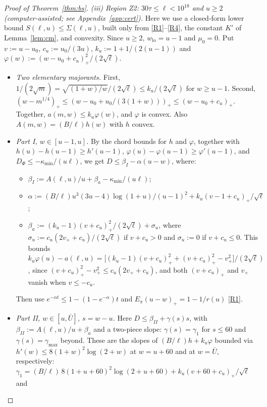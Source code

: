\begin{proof}[Proof of Theorem~\ref{thm:bs}]
\smallskip\noindent\emph{(iii) Region Z2: $30\tau\le\ell<10^{18}$ and $u\ge2$ (computer-assisted; see Appendix~\ref{app:cert}).}
Here we use a closed-form lower bound $S(\ell,u)\le\Sigma(\ell,u)$, built only from \ref{R1}--\ref{R4}, the constant $K'$ of
Lemma~\ref{lem:cm}, and convexity. Since $u\ge2$, $w_{\mathrm{lo}}=u-1$ and $\mu_0=0$. Put $v:=u-u_0$,
$c_u:=u_0/(3u)$, $k_u:=1+1/(2(u-1))$ and $\varphi(w):=(w-u_0+c_u)_+^2/(2\sqrt\ell)$.
\begin{itemize}
\item \emph{Two elementary majorants.} First, $1/(2\sqrt m)=\sqrt{(1+w)/w}/(2\sqrt\ell)\le k_u/(2\sqrt\ell)$ for $w\ge u-1$.
  Second, $(w-m^{1/4})_+\le(w-u_0+u_0/(3(1+w)))_+\le(w-u_0+c_u)_+$. Together, $a(m,w)\le k_u\varphi(w)$, and $\varphi$ is
  convex. Also $A(m,w)=(B/\ell)h(w)$ with $h$ convex.
\item \emph{Part I, $w\in[u-1,u]$.} By the chord bounds for $h$ and $\varphi$, together with $h(u)-h(u-1)\ge h'(u-1)$,
  $\varphi(u)-\varphi(u-1)\ge\varphi'(u-1)$, and $D_\Phi\le-\kappa_{\min}/(u\ell)$, we get $D\le\beta_I-\alpha(u-w)$, where:
  \begin{itemize}
  \item $\beta_I:=A(\ell,u)/u+\beta_a-\kappa_{\min}/(u\ell)$;
  \item $\alpha:=(B/\ell)u^3(3u-4)\log(1+u)/(u-1)^2+k_u(v-1+c_u)_+/\sqrt\ell$;
  \item $\beta_a:=(k_u-1)(v+c_u)_+^2/(2\sqrt\ell)+\sigma_u$, where $\sigma_u:=c_u(2v_++c_u)/(2\sqrt\ell)$ if $v+c_u>0$ and
    $\sigma_u:=0$ if $v+c_u\le0$. This bounds $k_u\varphi(u)-a(\ell,u)=\big[(k_u-1)(v+c_u)_+^2+(v+c_u)_+^2-v_+^2\big]/(2\sqrt\ell)$,
    since $(v+c_u)_+^2-v_+^2\le c_u(2v_++c_u)$, and both $(v+c_u)_+$ and $v_+$ vanish when $v\le-c_u$.
  \end{itemize}
  Then use $e^{-\alpha t}\le1-(1-e^{-\alpha})t$ and $E_\pi(u-w)_+=1-1/r(u)$ \ref{R1}.
\item \emph{Part II, $w\in[u,\bar U]$, $s=w-u$.} Here $D\le\beta_{II}+\gamma(s)s$, with $\beta_{II}:=A(\ell,u)/u+\beta_a$ and a
  two-piece slope: $\gamma(s)=\gamma_1$ for $s\le60$ and $\gamma(s)=\gamma_{\max}$ beyond. These are the slopes of
  $(B/\ell)h+k_u\varphi$ bounded via $h'(w)\le8(1+w)^2\log(2+w)$ at $w=u+60$ and at $w=\bar U$, respectively:
  $\gamma_1=(B/\ell)\,8(1+u+60)^2\log(2+u+60)+k_u(v+60+c_u)_+/\sqrt\ell$ and

\end{itemize}
\end{proof}
